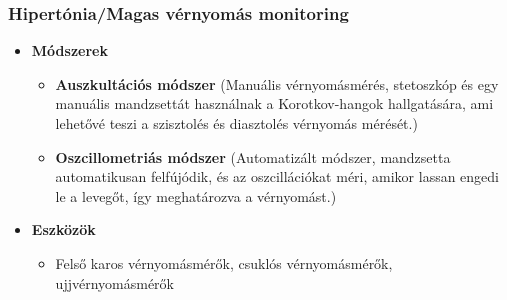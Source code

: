 \subsubsection{Hipertónia/Magas vérnyomás monitoring}
\begin{itemize}
    \item \textbf{Módszerek}
    \begin{itemize}
        \item \textbf{Auszkultációs módszer} (Manuális vérnyomásmérés, stetoszkóp és egy manuális mandzsettát használnak a Korotkov-hangok hallgatására, ami lehetővé teszi a szisztolés és diasztolés vérnyomás mérését.)
        \item \textbf{Oszcillometriás módszer} (Automatizált módszer, mandzsetta automatikusan felfújódik, és az oszcillációkat méri, amikor lassan engedi le a levegőt, így meghatározva a vérnyomást.)
    \end{itemize}
    \item \textbf{Eszközök}
    \begin{itemize}
        \item Felső karos vérnyomásmérők, csuklós vérnyomásmérők, ujjvérnyomásmérők
    \end{itemize}
\end{itemize}

\clearpage
